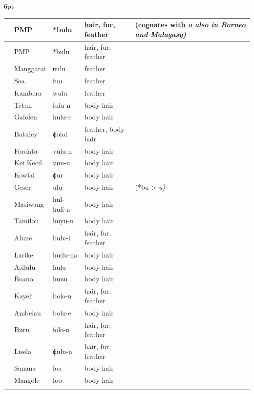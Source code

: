 {\st{6pt}\begin{xltabular}[l]{\linewidth}
{>{\hspace{-\tabcolsep}}l<{\hspace{-\tabcolsep}}
>{\hspace{-\tabcolsep}\enspace}lll
>{\raggedright\arraybackslash}X}
\lsptoprule
{}	&	PMP	&	*bulu	&	hair, fur, feather	&	(cognates with \it{o} also in Borneo and Malagasy)	\\	\midrule
\endfirsthead
\lsptoprule
{}	&	PMP	&	*bulu	&	hair, fur, feather	&		\\	\midrule
\endhead
	&	Manggarai	&	ʋulu	&	feather	&		\\
	&	So{\Q}a	&	fuu	&	feather	&		\\
	&	Kambera	&	wulu	&	feather	&		\\
	&	Tetun	&	fulu-n	&	body hair	&		\\
	&	Galolen	&	hulu-r	&	body hair	&		\\
\rcl	&	Batuley	&	ɸoloi	&	feather, body hair	&		\\
	&	Fordata	&	vulu-n	&	body hair	&		\\
	&	Kei Kecil	&	vuu-n	&	body hair	&		\\
	&	Kowiai	&	ɸur	&	body hair	&		\\
	&	Geser	&	ulu	&	body hair	&	 (*bu > \it{u})	\\
	&	Masiwang	&	hul-huli-n	&	body hair	&		\\
	&	Tamilou	&	huyu-n	&	body hair	&		\\
	&	Alune	&	bulu-i	&	hair, fur, feather	&		\\
	&	Larike	&	hudu-na	&	body hair	&		\\
	&	Asilulu	&	hulu-	&	body hair	&		\\
	&	Boano	&	hunu	&	body hair	&		\\
\rcl	&	Kayeli	&	bolo-n	&	hair, fur, feather	&		\\
\rcl	&	Ambelau	&	bolu-e	&	body hair	&		\\
\rcl	&	Buru	&	folo-n	&	hair, fur, feather	&		\\
	&	Lisela	&	ɸulu-n	&	hair, fur, feather	&		\\
\rcl	&	Sanana	&	foa	&	body hair	&		\\
\rcl	&	Mangole	&	foo	&	body hair	&		\\
\lspbottomrule
\end{xltabular}\addtocounter{table}{-1}}

